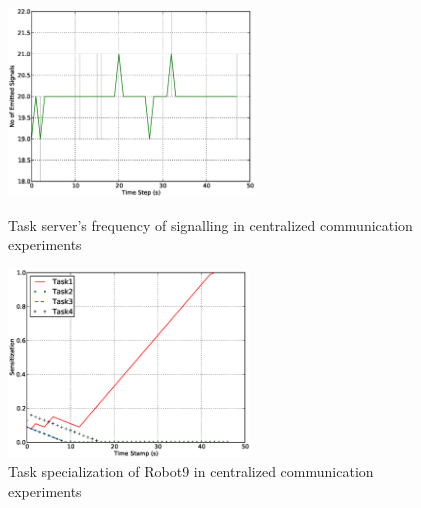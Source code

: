 \documentclass{llncs}
\begin{document}
\begin{figure}
\begin{minipage}[t]{0.5\linewidth}
\centering
\includegraphics[height=5cm,  angle=0]
{images/global/Global-SignalingFreqStat.eps}
\caption{\small Task server's frequency of signalling in centralized communication experiments}
\label{fig:g5} %
\end{minipage}
\hspace{0.5cm}
\begin{minipage}[t]{0.5\linewidth}
\centering
\includegraphics[height=5cm, angle=0]{images/global/PlotRobot9-Sensitizations-2010Feb18-121037.eps}
\caption{\small Task specialization of Robot9 in centralized communication experiments}
\label{fig:g6} %
\end{minipage}
\end{figure}
%
%
\end{document}
